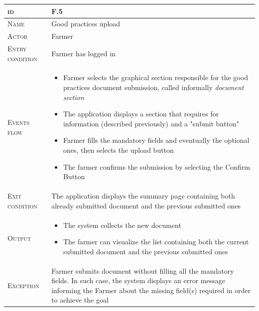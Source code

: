 \begin{table}[H]
    \centering
    \begin{tabular}{|l|p{}|}
        \hline %
    	\textsc{id}                 &   F.5\\
    	\hline %
    	\textsc{Name}               &   Good practices upload\\
    	\hline %
    	\textsc{Actor}             &   Farmer\\
    	\hline %
    	\textsc{Entry condition}   &   Farmer has logged in\\
    	\hline %
    	\textsc{Events flow}         &   %
            	                        \begin{itemize}
                                    	    \item Farmer selects the graphical section responsible for the good practices document submission, called informally \textit{document section}
                                    		\item The application displays a section that requires for information (described previously) and a "submit button"
                                    		\item Farmer fills the mandatory fields and eventually the optional ones, then selects the upload button
                                    		\item The farmer confirms the submission by selecting the Confirm Button
                                        \end{itemize}\\
        \hline %
        \textsc{Exit condition}    &  The application displays the summary page containing both already submitted document and the previous submitted ones\\
    	\hline %
    	\textsc{Output}             &  \begin{itemize}
    	    \item The system collects the new document
    	    \item The farmer can visualize the list containing both the current submitted document and the previous submitted ones
    	\end{itemize}\\
    	\hline %
    	\textsc{Exception}         &   Farmer submits document without filling all the mandatory fields. In such case, the system displays an error message informing the Farmer about the missing field(s) required in order to achieve the goal\\
    	\hline %
        

\end{tabular}
\end{table}
